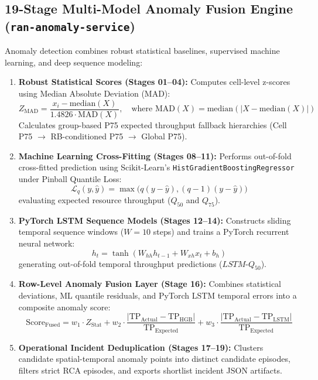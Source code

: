 \documentclass[12pt,a4paper]{report}
\begin{document}
\subsection{19-Stage Multi-Model Anomaly Fusion Engine (\texttt{ran-anomaly-service})}
Anomaly detection combines robust statistical baselines, supervised machine learning, and deep sequence modeling:
\begin{enumerate}
    \item \textbf{Robust Statistical Scores (Stages 01--04):} Computes cell-level z-scores using Median Absolute Deviation (MAD):
    \begin{equation}
    Z_{\text{MAD}} = \frac{x_i - \text{median}(X)}{1.4826 \cdot \text{MAD}(X)}, \quad \text{where } \text{MAD}(X) = \text{median}(|X - \text{median}(X)|)
    \end{equation}
    Calculates group-based P75 expected throughput fallback hierarchies (Cell P75 $\rightarrow$ RB-conditioned P75 $\rightarrow$ Global P75).
    
    \item \textbf{Machine Learning Cross-Fitting (Stages 08--11):} Performs out-of-fold cross-fitted prediction using Scikit-Learn's \texttt{HistGradientBoostingRegressor} under Pinball Quantile Loss:
    \begin{equation}
    \mathcal{L}_q(y, \hat{y}) = \max\Big(q(y - \hat{y}), (q-1)(y - \hat{y})\Big)
    \end{equation}
    evaluating expected resource throughput ($Q_{50}$ and $Q_{75}$).
    
    \item \textbf{PyTorch LSTM Sequence Models (Stages 12--14):} Constructs sliding temporal sequence windows ($W = 10$ steps) and trains a PyTorch recurrent neural network:
    \begin{equation}
    h_t = \tanh(W_{hh} h_{t-1} + W_{xh} x_t + b_h)
    \end{equation}
    generating out-of-fold temporal throughput predictions ($LSTM \text{-} Q_{50}$).
    
    \item \textbf{Row-Level Anomaly Fusion Layer (Stage 16):} Combines statistical deviations, ML quantile residuals, and PyTorch LSTM temporal errors into a composite anomaly score:
    \begin{equation}
    \text{Score}_{\text{Fused}} = w_1 \cdot Z_{\text{Stat}} + w_2 \cdot \frac{|\text{TP}_{\text{Actual}} - \text{TP}_{\text{HGB}}|}{\text{TP}_{\text{Expected}}} + w_3 \cdot \frac{|\text{TP}_{\text{Actual}} - \text{TP}_{\text{LSTM}}|}{\text{TP}_{\text{Expected}}}
    \end{equation}
    
    \item \textbf{Operational Incident Deduplication (Stages 17--19):} Clusters candidate spatial-temporal anomaly points into distinct candidate episodes, filters strict RCA episodes, and exports shortlist incident JSON artifacts.
\end{enumerate}
\end{document}
